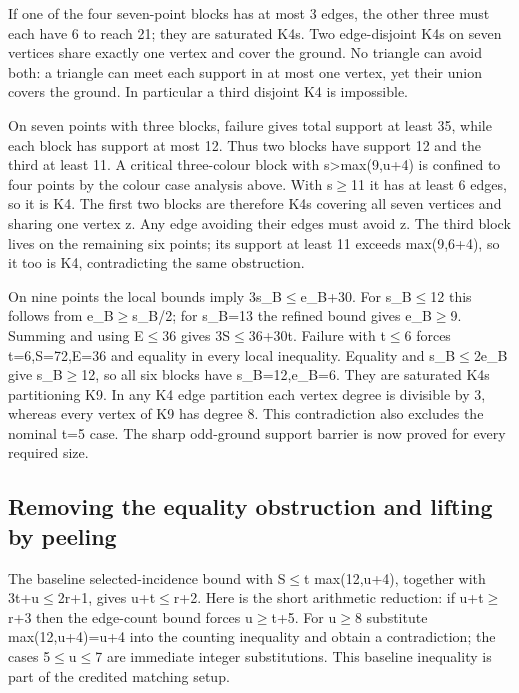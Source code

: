 \documentclass[11pt,a4paper]{article}
\begin{document}
If one of the four seven-point blocks has at most 3 edges, the other three must each have 6 to reach 21; they are saturated K4s. Two edge-disjoint K4s on seven vertices share exactly one vertex and cover the ground. No triangle can avoid both: a triangle can meet each support in at most one vertex, yet their union covers the ground. In particular a third disjoint K4 is impossible.

On seven points with three blocks, failure gives total support at least 35, while each block has support at most 12. Thus two blocks have support 12 and the third at least 11. A critical three-colour block with s>max(9,u+4) is confined to four points by the colour case analysis above. With s\ensuremath{\geq}11 it has at least 6 edges, so it is K4. The first two blocks are therefore K4s covering all seven vertices and sharing one vertex z. Any edge avoiding their edges must avoid z. The third block lives on the remaining six points; its support at least 11 exceeds max(9,6+4), so it too is K4, contradicting the same obstruction.

On nine points the local bounds imply 3s\_B\ensuremath{\leq}e\_B+30. For s\_B\ensuremath{\leq}12 this follows from e\_B\ensuremath{\geq}s\_B/2; for s\_B=13 the refined bound gives e\_B\ensuremath{\geq}9. Summing and using E\ensuremath{\leq}36 gives 3S\ensuremath{\leq}36+30t. Failure with t\ensuremath{\leq}6 forces t=6,S=72,E=36 and equality in every local inequality. Equality and s\_B\ensuremath{\leq}2e\_B give s\_B\ensuremath{\geq}12, so all six blocks have s\_B=12,e\_B=6. They are saturated K4s partitioning K9. In any K4 edge partition each vertex degree is divisible by 3, whereas every vertex of K9 has degree 8. This contradiction also excludes the nominal t=5 case. The sharp odd-ground support barrier is now proved for every required size.

\subsection{Removing the equality obstruction and lifting by peeling}
The baseline selected-incidence bound with S\ensuremath{\leq}t max(12,u+4), together with 3t+u\ensuremath{\leq}2r+1, gives u+t\ensuremath{\leq}r+2. Here is the short arithmetic reduction: if u+t\ensuremath{\geq}r+3 then the edge-count bound forces u\ensuremath{\geq}t+5. For u\ensuremath{\geq}8 substitute max(12,u+4)=u+4 into the counting inequality and obtain a contradiction; the cases 5\ensuremath{\leq}u\ensuremath{\leq}7 are immediate integer substitutions. This baseline inequality is part of the credited matching setup.
\end{document}
